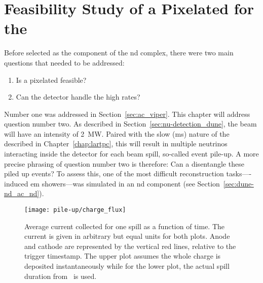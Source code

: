 \section{Feasibility Study of a Pixelated  for the  }
\label{sec:dune-nd_pile-up}

Before \AC{} selected as  the \lar{} component of the \dune{} \gls{nd} complex, there were two main questions that needed to be addressed:
\begin{enumerate}
	\item Is a pixelated \lartpc{} feasible?
	\item Can the \lar{} detector handle the high rates?
\end{enumerate}
Number one was addressed in Section~\ref{sec:ac_viper}.
This chapter will address question number two.
As described in Section~\ref{sec:nu-detection_dune}, the \dune{} beam will have an intensity of \SI{2}{\mega\watt}.
Paired with the slow (\si{\milli\second}) nature of the \lartpc{} described in Chapter~\ref{chap:lartpc}, this will result in multiple neutrinos interacting inside the detector for each beam spill, so-called event pile-up.
A more precise phrasing of question number two is therefore: Can a \lartpc{} disentangle these piled up events?
To assess this, one of the most difficult reconstruction tasks---\Pgpz-induced \gls{em} showers---was simulated in an \AC{} \gls{nd} component (see Section~\ref{sec:dune-nd_ac_nd}).

\begin{figure}[htb]
	\centering
	\texttt{[image: pile-up/charge\_flux]}
	\caption[Average current collected for one spill as a function of time]{%
		Average current collected for one spill as a function of time.
		The current is given in arbitrary but equal units for both plots.
		Anode and cathode are represented by the vertical red lines, relative to the trigger timestamp.
		The upper plot assumes the whole charge is deposited instantaneously while for the lower plot, the actual spill duration from~\cite{dune2} is used.
	}
	\label{fig:dune-nd_charge-flux}
\end{figure}

